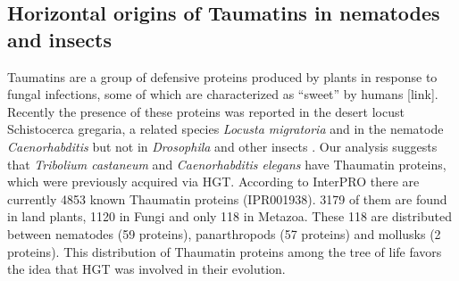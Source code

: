 \subsection{Horizontal origins of Taumatins in nematodes and insects}
Taumatins are a group of defensive proteins produced by plants in response to
fungal infections, some of which are characterized as “sweet” by humans [link].
Recently the presence of these proteins was reported in the desert locust
Schistocerca gregaria, a related species \textit{Locusta migratoria} and in the
nematode \textit{Caenorhabditis} but not in \textit{Drosophila} and other insects
\cite{Brandazza2004}. Our analysis suggests that \textit{Tribolium castaneum}
and \textit{Caenorhabditis elegans} have Thaumatin proteins, which were
previously acquired via HGT. According to InterPRO \cite{Finn2017} there are
currently 4853 known Thaumatin proteins (IPR001938). 3179 of them are found in
land plants, 1120 in Fungi and only 118 in Metazoa. These 118 are distributed
between nematodes (59 proteins), panarthropods (57 proteins) and mollusks (2
proteins). This distribution of Thaumatin proteins among the tree of life
favors the idea that HGT was involved in their evolution.
